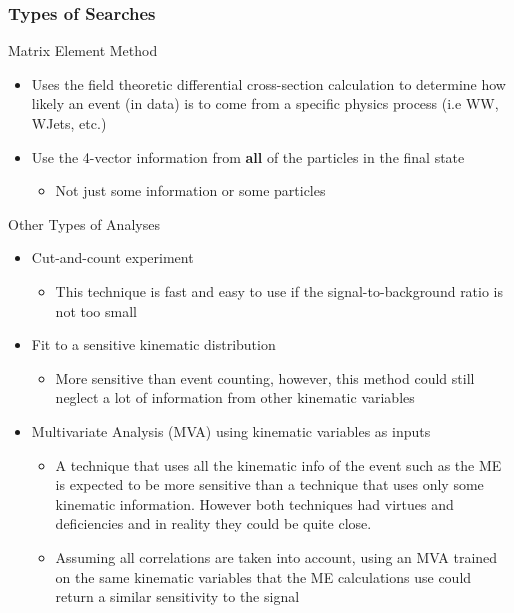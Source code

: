 \begin{frame}[shrink=7.4]
	\frametitle{Types of Searches}
	\vspace*{-0.15cm}
	\begin{block}{Matrix Element Method}
		\begin{itemize}
			\item Uses the field theoretic differential cross-section calculation to determine how likely an event (in data) is to come from a specific physics process (i.e WW, WJets, etc.)
			\item Use the 4-vector information from \textbf{all} of the particles in the final state
			\begin{itemize}
				\item Not just some information or some particles
			\end{itemize}
		\end{itemize}
	\end{block}
	\vspace*{-0.15cm}
	\begin{block}{Other Types of Analyses}
		\begin{itemize}
			\item Cut-and-count experiment
			\begin{itemize}
				\item This technique is fast and easy to use if the signal-to-background ratio is not too small
			\end{itemize}
			\item Fit to a sensitive kinematic distribution
			\begin{itemize}
				\item More sensitive than event counting, however, this method could still neglect a lot of information from other kinematic variables
			\end{itemize}
			\item Multivariate Analysis (MVA) using kinematic variables as inputs
			\begin{itemize}
				\item A technique that uses all the kinematic info of the event such as the ME is expected to be more sensitive than a technique that uses only some kinematic information. However both techniques had virtues and deficiencies and in reality they could be quite close.
				\item Assuming all correlations are taken into account, using an MVA trained on the same kinematic variables that the ME calculations use could return a similar sensitivity to the signal
			\end{itemize}
		\end{itemize}
	\end{block}
\end{frame}

